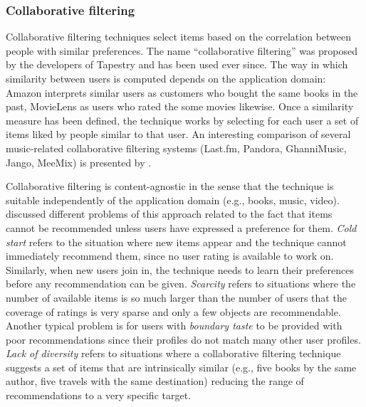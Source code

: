 \subsubsection{Collaborative filtering} %
\label{ssub:collaborative_filtering}

Collaborative filtering techniques select items based on the correlation between people with similar preferences. 
The name ``collaborative filtering'' was proposed by the developers of Tapestry \cite{Goldberg92} and has been used ever since.
The way in which similarity between users is computed depends on the application domain: Amazon interprets similar users as customers who bought the same books in the past, MovieLens as users who rated the some movies likewise.
Once a similarity measure has been defined, the technique works by selecting for each user a set of items liked by people similar to that user.
An interesting comparison of several music-related collaborative filtering systems (Last.fm, Pandora, GhanniMusic, Jango, MeeMix) is presented by \citet{Fox07}.


Collaborative filtering is content-agnostic in the sense that the technique is suitable independently of the application domain (e.g., books, music, video).
\citet{Herlocker04} discussed different problems of this approach related to the fact that items cannot be recommended unless users have expressed a preference for them. 
\emph{Cold start} refers to the situation where new items appear and the technique cannot immediately recommend them, since no user rating is available to work on. 
Similarly, when new users join in, the technique needs to learn their preferences before any recommendation can be given. 
\emph{Scarcity} refers to situations where the number of available items is so much larger than the number of users that the coverage of ratings is very sparse and only a few objects are recommendable. 
Another typical problem is for users with \emph{boundary taste} to be provided with poor recommendations since their profiles do not match many other user profiles. 
\emph{Lack of diversity} refers to situations where a collaborative filtering technique suggests a set of items that are intrinsically similar (e.g., five books by the same author, five travels with the same destination) reducing the range of recommendations to a very specific target. 

